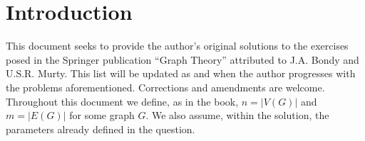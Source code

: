 \section*{Introduction}
This document seeks to provide the author's original solutions to the exercises posed in the Springer publication ``Graph Theory'' attributed to J.A. Bondy and U.S.R. Murty. This list will be updated as and when the author progresses with the problems aforementioned. Corrections and amendments are welcome. \\

Throughout this document we define, as in the book, $n = |V(G)|$ and $m = |E(G)|$ for some graph $G$. We also assume, within the solution, the parameters already defined in the question.